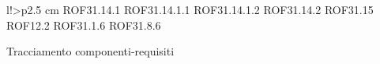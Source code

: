 \begin{tabella}{l!{\VRule}>{\centering\arraybackslash}p{2.5 cm}}
ROF31.14.1 \linebreak ROF31.14.1.1 \linebreak ROF31.14.1.2 \linebreak ROF31.14.2 \linebreak ROF31.15 \linebreak ROF12.2 \linebreak ROF31.1.6 \linebreak ROF31.8.6 \\
\caption{Tracciamento componenti-requisiti}
\end{tabella}

